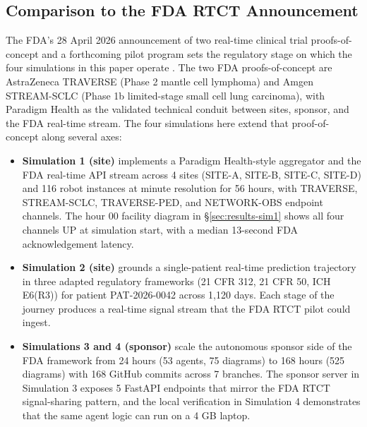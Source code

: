 
\subsection{Comparison to the FDA RTCT Announcement}
\label{sec:disc-fda}

The FDA's 28 April 2026 announcement of two real-time clinical trial
proofs-of-concept and a forthcoming pilot program sets the regulatory
stage on which the four simulations in this paper operate
\cite{fda2026realtime}. The two FDA proofs-of-concept are AstraZeneca
TRAVERSE (Phase 2 mantle cell lymphoma) and Amgen STREAM-SCLC (Phase
1b limited-stage small cell lung carcinoma), with Paradigm Health as
the validated technical conduit between sites, sponsor, and the FDA
real-time stream. The four simulations here extend that proof-of-
concept along several axes:

\begin{itemize}[leftmargin=*]
\item \textbf{Simulation 1 (site)} implements a Paradigm Health-style
aggregator and the FDA real-time API stream across 4 sites (SITE-A,
SITE-B, SITE-C, SITE-D) and 116 robot instances at minute resolution
for 56 hours, with TRAVERSE, STREAM-SCLC, TRAVERSE-PED, and
NETWORK-OBS endpoint channels. The hour 00 facility diagram in
\S\ref{sec:results-sim1} shows all four channels UP at simulation
start, with a median 13-second FDA acknowledgement latency.

\item \textbf{Simulation 2 (site)} grounds a single-patient real-time
prediction trajectory in three adapted regulatory frameworks (21 CFR
312, 21 CFR 50, ICH E6(R3)) for patient PAT-2026-0042 across 1,120
days. Each stage of the journey produces a real-time signal stream
that the FDA RTCT pilot could ingest.

\item \textbf{Simulations 3 and 4 (sponsor)} scale the autonomous
sponsor side of the FDA framework from 24 hours (53 agents, 75
diagrams) to 168 hours (525 diagrams) with 168 GitHub commits across
7 branches. The sponsor server in Simulation 3 exposes 5 FastAPI
endpoints that mirror the FDA RTCT signal-sharing pattern, and the
local verification in Simulation 4 demonstrates that the same agent
logic can run on a 4 GB laptop.
\end{itemize}


